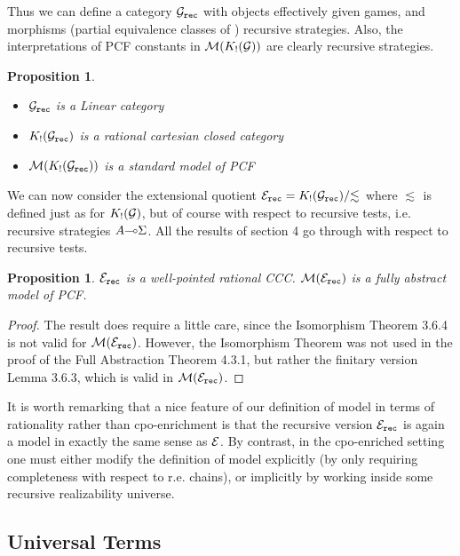 \documentclass[11pt]{article}
\newtheorem{proposition}[theorem]{Proposition}
\newcommand{\E}{{\cal E}}
\newcommand{\G}{{\cal G}}
\newcommand{\M}{{\cal M}}
\newcommand{\Ip}[1]{\lesssim_{#1}}
\newcommand{\linimpl}{\mbox{$\multimap$}}
\begin{document}
Thus we can define a category $\G_{\tt rec}$ with objects effectively  given
games, and morphisms (partial equivalence classes of ) recursive strategies.
Also, the interpretations of PCF constants in $\M(K_{!}(\G))$ are clearly
recursive strategies.

\begin{proposition}
\begin{itemize}
\item[(i)] $\G_{\tt rec}$ is a Linear category
\item[(ii)] $K_{!}(\G_{\tt rec})$ is a rational cartesian closed category
\item[(iii)] $\M(K_{!}(\G_{\tt rec }))$ is a standard model of PCF
\end{itemize}
\end{proposition}

We can now consider the extensional quotient $\E_{\tt
rec}=K_{!}(\G_{\tt rec}) /{\Ip{}}$ where $\Ip{}$ is defined just
as for $K_{!}(\G)$, but of course with respect to recursive tests,
i.e. recursive strategies $A\linimpl \Siepinski$. All the results
of section 4 go through with respect to recursive tests.

\begin{proposition}
$\E_{\tt rec }$ is a well-pointed rational CCC. $\M(\E_{\tt rec })$ is a
fully abstract model of PCF.
\end{proposition}
\begin{proof} The result does require a little care, since the
Isomorphism Theorem 3.6.4 is not valid for $\M(\E_{\tt rec})$.
However, the Isomorphism Theorem was not used in the proof of the
Full Abstraction Theorem 4.3.1, but rather the finitary version
Lemma 3.6.3, which is valid in $\M(\E_{\tt rec})$.
\end{proof}

It is worth remarking that a nice feature of our definition of model in
terms of rationality rather than cpo-enrichment is that the recursive
version $\E_{\tt rec}$ is again a model in exactly the same sense as $\E$. By
contrast, in the cpo-enriched setting one must either modify the definition
of model explicitly (by only requiring completeness with respect to
r.e. chains), or implicitly by working inside some recursive realizability
universe.

\subsection{ Universal Terms }
\end{document}

